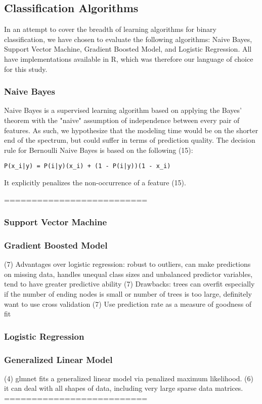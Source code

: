 \documentclass[a4paper]{article}
\begin{document}
\begin{multicols}{2}
\subsection*{Classification Algorithms}
In an attempt to cover the breadth of learning algorithms for binary classification, we have chosen to evaluate the following algorithms: Naive Bayes, Support Vector Machine, Gradient Boosted Model, and Logistic Regression. All have implementations available in R, which was therefore our language of choice for this study.


\subsubsection*{Naive Bayes}
Naive Bayes is a supervised learning algorithm based on applying the Bayes' theorem with the "naive" assumption of independence between every pair of features. As such, we hypothesize that the modeling time would be on the shorter end of the spectrum, but could suffer in terms of prediction quality. The decision rule for Bernoulli Naive Bayes is based on the following (15):
\begin{verbatim}
P(x_i|y) = P(i|y)(x_i) + (1 - P(i|y))(1 - x_i)
\end{verbatim}
It explicitly penalizes the non-occurrence of a feature (15).

==========================
\subsubsection*{Support Vector Machine}
\subsubsection*{Gradient Boosted Model}
(7) Advantages over logistic regression: robust to outliers, can make predictions on missing data, handles unequal class sizes and unbalanced predictor variables, tend to have greater predictive ability
(7) Drawbacks: trees can overfit especially if the number of ending nodes is small or number of trees is too large, definitely want to use cross validation
(7) Use prediction rate as a measure of goodness of fit
\subsubsection*{Logistic Regression}
\subsubsection*{Generalized Linear Model}
(4) glmnet fits a generalized linear model via penalized maximum likelihood.
(6) it can deal with all shapes of data, including very large sparse data matrices.
==========================


\end{multicols}
\end{document}
